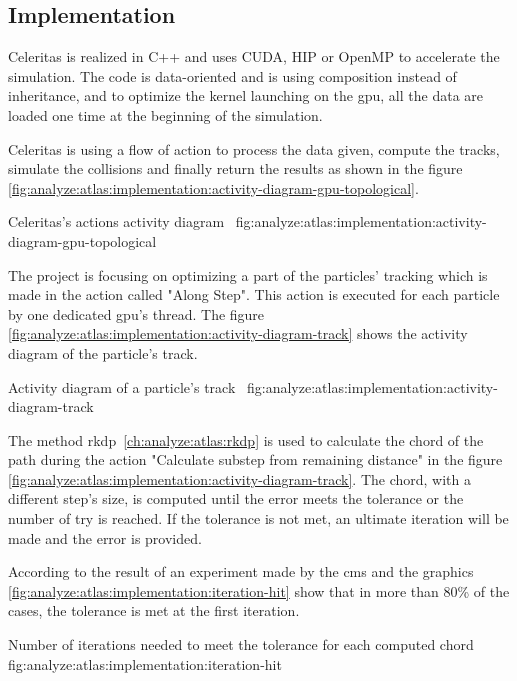 \subsection{Implementation}
\label{ch:analyze:atlas:implementation}

Celeritas is realized in C++ and uses CUDA, HIP or OpenMP to accelerate the
simulation.
The code is data-oriented and is using composition instead of inheritance, and
to optimize the kernel launching on the \acrshort{gpu}, all the data are loaded
one time at the beginning of the simulation.

Celeritas is using a flow of action to process the data given, compute the
tracks, simulate the collisions and finally return the results as shown in the
figure \ref{fig:analyze:atlas:implementation:activity-diagram-gpu-topological}.

{Celeritas's actions activity diagram~\cite{chep2023-presentation-johnson}}
{fig:analyze:atlas:implementation:activity-diagram-gpu-topological}

The project is focusing on optimizing a part of the particles' tracking which is
made in the action called "Along Step".
This action is executed for each particle by one dedicated \acrshort{gpu}'s
thread.
The figure \ref{fig:analyze:atlas:implementation:activity-diagram-track} shows
the activity diagram of the particle's track.

{Activity diagram of a particle's track~\cite{atlas-week-esseiva}}
{fig:analyze:atlas:implementation:activity-diagram-track}

The method \acrshort{rkdp}~\ref{ch:analyze:atlas:rkdp} is used to calculate the
chord of the path during the action "Calculate substep from remaining distance"
in the figure \ref{fig:analyze:atlas:implementation:activity-diagram-track}.
The chord, with a different step's size, is computed until the error meets the tolerance or the number of try
is reached.
If the tolerance is not met, an ultimate iteration will be made and the error
is provided.

According to the result of an experiment made by the \acrfull{cms} and the
graphics \ref{fig:analyze:atlas:implementation:iteration-hit} show that in more than 80\% of the cases, the tolerance is
met at the first iteration.

{Number of iterations needed to meet the tolerance for each computed chord}
{fig:analyze:atlas:implementation:iteration-hit}


